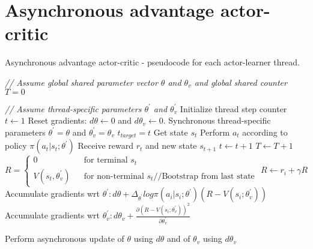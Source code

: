 \documentclass[12pt,a4paper]{article}
\begin{document}
\section{Asynchronous advantage actor-critic}
\begin{algorithm} 
	\caption{Asynchronous advantage actor-critic - pseudocode for each actor-learner thread.}
	\label{asynchronous_advantage_actor_critic}
	\begin{algorithmic}[1]
		\State \textit{// Assume global shared parameter vector $\theta$ and $\theta_{v}$ and global shared counter $T = 0$}
		
		\State \textit{// Assume thread-specific parameters $\theta^{'}$ and $\theta_{v}^{'}$}
		\State Initialize thread step counter $t \leftarrow 1$
		\Repeat 
			\State Reset gradients: $d\theta \leftarrow 0$ and $d\theta_{v} \leftarrow 0$.
			\State Synchronous thread-specific parameters $\theta^{'} = \theta$ and $\theta_{v}^{'} = \theta_{v}$
			\State $t_{target} = t$
			\State Get state $s_{t}$
			\Repeat
				\State Perform $a_t$ according to policy $\pi(a_{t}|s_{t};\theta^{'})$
				\State Receive reward $r_{t}$ and new state $s_{t+1}$
				\State $t \leftarrow t + 1$
				\State $T \leftarrow T + 1$
			\State $R = \left\lbrace
				\begin{array}{lcl}
					0 & & \text{for terminal }s_{t} \\
					V(s_{t}, \theta_{v}^{'}) & & \text{for non-terminal }s_{t} \text{//Bootstrap from last state}
				\end{array}	\right.$	
				\State $R \leftarrow r_{i} + \gamma R$
				\State Accumulate gradients wrt $\theta^{'}: d\theta + \Delta_{\theta^{'}}log\pi(a_{i}|s_{i};\theta^{'})(R - V(s_{i};\theta_{v}^{'}))$
				\State Accumulate gradients wrt $\theta_{v}^{'}: d\theta_{v} + \frac{\partial{(R-V(s_{i}; \theta_{v}^{'}))^{2}}}{\partial\theta_{v}^{'}}$
				
			\EndFor	
			\State Perform asynchronous update of $\theta$ using $d\theta$ and of $\theta_{v}$ using $d\theta_{v}$
		
	\end{algorithmic}
\end{algorithm}



\end{document}
